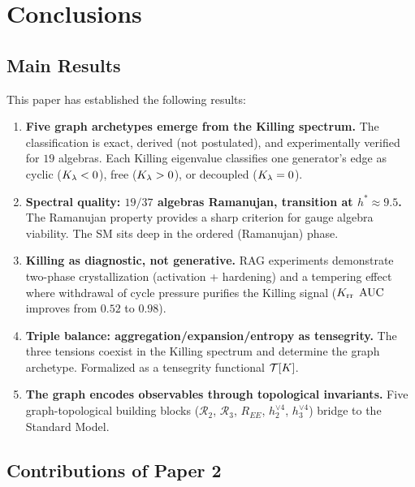 \section{Conclusions}\label{sec:conclusions}

\subsection{Main Results}\label{sec:main_results_p2}

This paper has established the following results:

\begin{enumerate}
    \item \textbf{Five graph archetypes emerge from the Killing spectrum.} The classification is exact, derived (not postulated), and experimentally verified for $19$ algebras. Each Killing eigenvalue classifies one generator's edge as cyclic ($K_\lambda < 0$), free ($K_\lambda > 0$), or decoupled ($K_\lambda = 0$).

    \item \textbf{Spectral quality: $19/37$ algebras Ramanujan, transition at $h^* \approx 9.5$.} The Ramanujan property provides a sharp criterion for gauge algebra viability. The SM sits deep in the ordered (Ramanujan) phase.

    \item \textbf{Killing as diagnostic, not generative.} RAG experiments demonstrate two-phase crystallization (activation + hardening) and a tempering effect where withdrawal of cycle pressure purifies the Killing signal ($K_{\mathrm{rr}}$ $\mathrm{AUC}$ improves from $0.52$ to $0.98$).

    \item \textbf{Triple balance: aggregation/expansion/entropy as tensegrity.} The three tensions coexist in the Killing spectrum and determine the graph archetype. Formalized as a tensegrity functional $\mathcal{T}[K]$.

    \item \textbf{The graph encodes observables through topological invariants.} Five graph-topological building blocks ($\mathcal{R}_2$, $\mathcal{R}_3$, $R_{EE}$, $h_2^{\vee 4}$, $h_3^{\vee 4}$) bridge to the Standard Model.
\end{enumerate}

\subsection{Contributions of Paper 2}\label{sec:contributions}

